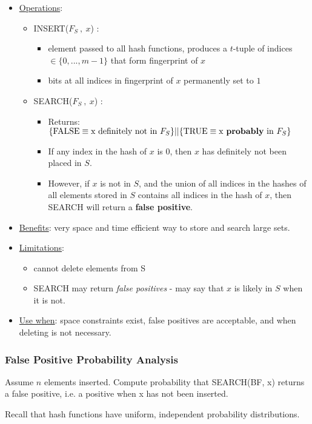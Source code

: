 \documentclass[12pt]{article}
\newcommand\graytag[1]{\text{\textsl{\color{gray}{#1}}}}
\begin{document}
\begin{itemize}
\item \underline{Operations}: 
	\begin{itemize}
	\item [\graytag{$\Theta(n)$}] INSERT($F_S\:, \: x$) $: $ \graytag{for $i$ from $1$ to $t, \: BF[h_i(x)]=1;$}
		\begin{itemize}
		\item element passed to all hash functions, produces a $t$-tuple of indices $\in \{0, ..., m-1\}$ that form fingerprint of $x$
		\item bits at all indices in fingerprint of $x$ permanently set to $1$
		\end{itemize}
	\item  [\graytag{$\Theta(n)$}] SEARCH($F_S\:, \: x$) $: $ \graytag{for $i$ from $1$ to $t$, if (BF$[h_i(x)] == 0$) return FALSE, else return TRUE}
		\begin{itemize}
		\item Returns: $\{\text{FALSE}\equiv\text{x definitely not in }F_S\} 
			||  \{\text{TRUE}\equiv\text{x \textbf{probably} in }F_S\}$
		\item If any index in the hash of $x$ is $0$, then $x$ has definitely not been placed in $S$.
		\item However, if $x$ is not in $S$, and the union of all indices in the hashes of all elements stored in $S$ contains all indices in the hash of $x$, then SEARCH will return a \textbf{false positive}.
		\end{itemize}
	\end{itemize}
\item \underline{Benefits}: very space and time efficient way to store and search large sets.	
\item \underline{Limitations}: 
	\begin{itemize}
	\item cannot delete elements from S
	\item SEARCH may return \emph{false positives} - may say that $x$ is likely in $S$ when it is not.
	\end{itemize}
\item \underline{Use when}: space constraints exist, false positives are acceptable, and when deleting is not necessary.
\end{itemize}
\newpage \color{white}{.} \color{black} 

\subsubsection*{False Positive Probability Analysis}

Assume $n$ elements inserted. Compute probability that SEARCH(BF, x) returns a false positive, i.e. a positive when x has not been inserted.

Recall that hash functions have uniform, independent probability distributions.





\end{document}

